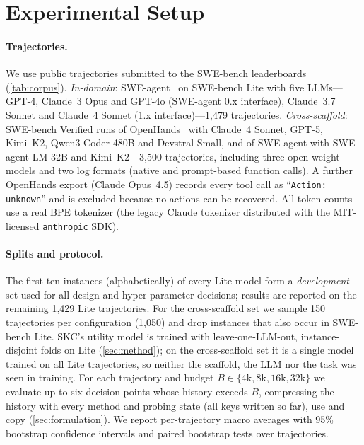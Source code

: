 \section{Experimental Setup}
\label{sec:setup}

\paragraph{Trajectories.} We use public trajectories submitted to the SWE-bench
leaderboards~\citep{jimenez2024swebench} (\cref{tab:corpus}). \emph{In-domain}:
SWE-agent~\citep{yang2024sweagent} on SWE-bench Lite with five LLMs---GPT-4,
Claude~3 Opus and GPT-4o (SWE-agent 0.x interface), Claude~3.7 Sonnet and
Claude~4 Sonnet (1.x interface)---1{,}479 trajectories. \emph{Cross-scaffold}:
SWE-bench Verified runs of OpenHands~\citep{wang2025openhands} with Claude~4
Sonnet, GPT-5, Kimi~K2, Qwen3-Coder-480B and Devstral-Small, and of SWE-agent
with SWE-agent-LM-32B and Kimi~K2---3{,}500 trajectories, including three
open-weight models and two log formats (native and prompt-based function
calls). A further OpenHands export (Claude Opus~4.5) records every tool call as
``\texttt{Action: unknown}'' and is excluded because no actions can be
recovered. All token counts use a real BPE tokenizer (the legacy Claude
tokenizer distributed with the MIT-licensed \texttt{anthropic} SDK).

\paragraph{Splits and protocol.} The first ten instances (alphabetically) of
every Lite model form a \emph{development} set used for all design and
hyper-parameter decisions; results are reported on the remaining 1{,}429 Lite
trajectories. For the cross-scaffold set we sample 150 trajectories per
configuration (1{,}050) and drop instances that also occur in SWE-bench Lite.
SKC's utility model is trained with leave-one-LLM-out, instance-disjoint folds
on Lite (\cref{sec:method}); on the cross-scaffold set it is a single model
trained on all Lite trajectories, so neither the scaffold, the LLM nor the task
was seen in training. For each trajectory and budget
$B\in\{4\text{k},8\text{k},16\text{k},32\text{k}\}$ we evaluate up to six
decision points whose history exceeds $B$, compressing the history with every
method and probing state (all keys written so far), use and copy
(\cref{sec:formulation}). We report per-trajectory macro averages with 95\%
bootstrap confidence intervals and paired bootstrap tests over trajectories.

